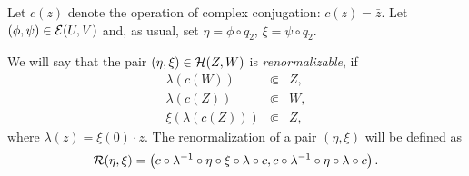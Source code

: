Let $c(z)$ denote the operation of complex conjugation: $c(z)=\bar{z}$. 
Let $(\phi,\psi)\in\mathcal{E}(U,V)$ and, as usual, set $\eta=\phi\circ q_2$, $\xi=\psi\circ q_2$. 


\begin{definition}\label{def:renormalizability} 
We will say that the  pair $(\eta,\xi)\in\mathcal{H}(Z,W)$ is {\it renormalizable}, if 
\begin{eqnarray}
\label{eq:inclusion1} \lambda(c(W)) &\Subset& Z, \\
\label{eq:inclusion2} \lambda(c(Z)) &\Subset& W, \\
\label{eq:inclusion3} \xi(\lambda(c(Z))) &\Subset& Z,
\end{eqnarray}
where $\lambda(z)=\xi(0) \cdot z$. The renormalization of a pair $(\eta,\xi)$ will be defined as 
\begin{equation}\label{eq:renpairs}
\mathcal{R} (\eta,\xi)=\left(c \circ \lambda^{-1} \circ \eta \circ \xi \circ \lambda \circ c  ,  c \circ \lambda^{-1} \circ \eta \circ \lambda \circ c \right).
\end{equation}
\end{definition}

